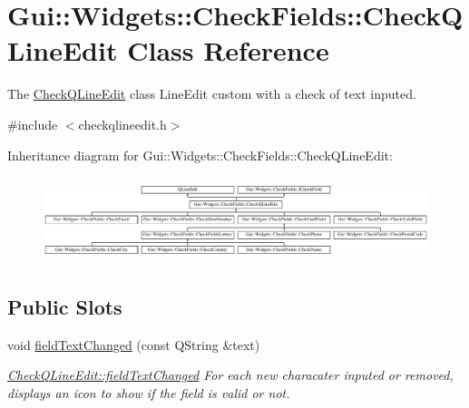 \hypertarget{classGui_1_1Widgets_1_1CheckFields_1_1CheckQLineEdit}{\section{Gui\-:\-:Widgets\-:\-:Check\-Fields\-:\-:Check\-Q\-Line\-Edit Class Reference}
\label{classGui_1_1Widgets_1_1CheckFields_1_1CheckQLineEdit}
}


The \hyperlink{classGui_1_1Widgets_1_1CheckFields_1_1CheckQLineEdit}{Check\-Q\-Line\-Edit} class Line\-Edit custom with a check of text inputed.  




{\ttfamily \#include $<$checkqlineedit.\-h$>$}

Inheritance diagram for Gui\-:\-:Widgets\-:\-:Check\-Fields\-:\-:Check\-Q\-Line\-Edit\-:\begin{figure}[H]
\begin{center}
\leavevmode
\includegraphics[height=2.508961cm]{d0/d68/classGui_1_1Widgets_1_1CheckFields_1_1CheckQLineEdit}
\end{center}
\end{figure}
\subsection*{Public Slots}
\begin{DoxyCompactItemize}
\item 
\hypertarget{classGui_1_1Widgets_1_1CheckFields_1_1CheckQLineEdit_ad297d518964bd170e8cc7533795ff99e}{void \hyperlink{classGui_1_1Widgets_1_1CheckFields_1_1CheckQLineEdit_ad297d518964bd170e8cc7533795ff99e}{field\-Text\-Changed} (const Q\-String \&text)}\label{classGui_1_1Widgets_1_1CheckFields_1_1CheckQLineEdit_ad297d518964bd170e8cc7533795ff99e}

\begin{DoxyCompactList}\small\item\em \hyperlink{classGui_1_1Widgets_1_1CheckFields_1_1CheckQLineEdit_ad297d518964bd170e8cc7533795ff99e}{Check\-Q\-Line\-Edit\-::field\-Text\-Changed} For each new characater inputed or removed, displays an icon to show if the field is valid or not. \end{DoxyCompactList}\end{DoxyCompactItemize}
